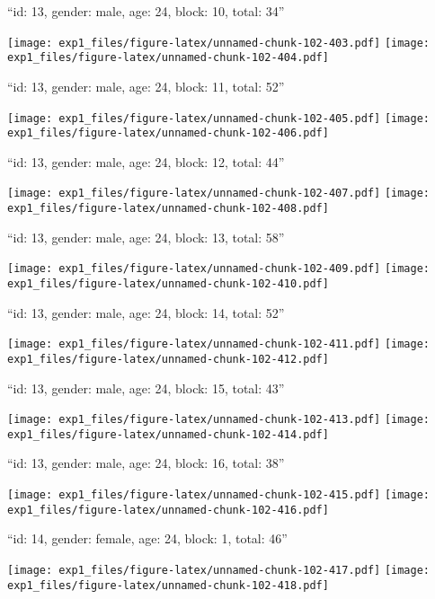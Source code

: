 \documentclass[11pt,,]{article}
\begin{document}
\newpage
[1] 

``id: 13, gender: male, age: 24, block: 10, total: 34''

\texttt{[image: exp1\_files/figure-latex/unnamed-chunk-102-403.pdf]}
\texttt{[image: exp1\_files/figure-latex/unnamed-chunk-102-404.pdf]}

\newpage
[1] 

``id: 13, gender: male, age: 24, block: 11, total: 52''

\texttt{[image: exp1\_files/figure-latex/unnamed-chunk-102-405.pdf]}
\texttt{[image: exp1\_files/figure-latex/unnamed-chunk-102-406.pdf]}

\newpage
[1] 

``id: 13, gender: male, age: 24, block: 12, total: 44''

\texttt{[image: exp1\_files/figure-latex/unnamed-chunk-102-407.pdf]}
\texttt{[image: exp1\_files/figure-latex/unnamed-chunk-102-408.pdf]}

\newpage
[1] 

``id: 13, gender: male, age: 24, block: 13, total: 58''

\texttt{[image: exp1\_files/figure-latex/unnamed-chunk-102-409.pdf]}
\texttt{[image: exp1\_files/figure-latex/unnamed-chunk-102-410.pdf]}

\newpage
[1] 

``id: 13, gender: male, age: 24, block: 14, total: 52''

\texttt{[image: exp1\_files/figure-latex/unnamed-chunk-102-411.pdf]}
\texttt{[image: exp1\_files/figure-latex/unnamed-chunk-102-412.pdf]}

\newpage
[1] 

``id: 13, gender: male, age: 24, block: 15, total: 43''

\texttt{[image: exp1\_files/figure-latex/unnamed-chunk-102-413.pdf]}
\texttt{[image: exp1\_files/figure-latex/unnamed-chunk-102-414.pdf]}

\newpage
[1] 

``id: 13, gender: male, age: 24, block: 16, total: 38''

\texttt{[image: exp1\_files/figure-latex/unnamed-chunk-102-415.pdf]}
\texttt{[image: exp1\_files/figure-latex/unnamed-chunk-102-416.pdf]}

\newpage
[1] 

``id: 14, gender: female, age: 24, block: 1, total: 46''

\texttt{[image: exp1\_files/figure-latex/unnamed-chunk-102-417.pdf]}
\texttt{[image: exp1\_files/figure-latex/unnamed-chunk-102-418.pdf]}
\end{document}
